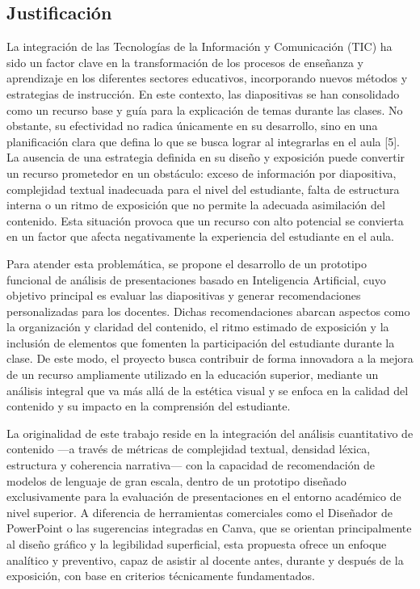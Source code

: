 \documentclass[11pt]{article}
\begin{document}
\subsection*{Justificación}
La integración de las Tecnologías de la Información y Comunicación (TIC) ha sido un factor clave en la transformación de los procesos de enseñanza y aprendizaje en los diferentes sectores educativos, incorporando nuevos métodos y estrategias de instrucción. En este contexto, las diapositivas se han consolidado como un recurso base y guía para la explicación de temas durante las clases. No obstante, su efectividad no radica únicamente en su desarrollo, sino en una planificación clara que defina lo que se busca lograr al integrarlas en el aula [5]. La ausencia de una estrategia definida en su diseño y exposición puede convertir un recurso prometedor en un obstáculo: exceso de información por diapositiva, complejidad textual inadecuada para el nivel del estudiante, falta de estructura interna o un ritmo de exposición que no permite la adecuada asimilación del contenido. Esta situación provoca que un recurso con alto potencial se convierta en un factor que afecta negativamente la experiencia del estudiante en el aula.

Para atender esta problemática, se propone el desarrollo de un prototipo funcional de análisis de presentaciones basado en Inteligencia Artificial, cuyo objetivo principal es evaluar las diapositivas y generar recomendaciones personalizadas para los docentes. Dichas recomendaciones abarcan aspectos como la organización y claridad del contenido, el ritmo estimado de exposición y la inclusión de elementos que fomenten la participación del estudiante durante la clase. De este modo, el proyecto busca contribuir de forma innovadora a la mejora de un recurso ampliamente utilizado en la educación superior, mediante un análisis integral que va más allá de la estética visual y se enfoca en la calidad del contenido y su impacto en la comprensión del estudiante.

La originalidad de este trabajo reside en la integración del análisis cuantitativo de contenido —a través de métricas de complejidad textual, densidad léxica, estructura y coherencia narrativa— con la capacidad de recomendación de modelos de lenguaje de gran escala, dentro de un prototipo diseñado exclusivamente para la evaluación de presentaciones en el entorno académico de nivel superior. A diferencia de herramientas comerciales como el Diseñador de PowerPoint o las sugerencias integradas en Canva, que se orientan principalmente al diseño gráfico y la legibilidad superficial, esta propuesta ofrece un enfoque analítico y preventivo, capaz de asistir al docente antes, durante y después de la exposición, con base en criterios técnicamente fundamentados.
\end{document}
